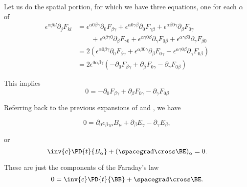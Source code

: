 Let us do the spatial portion, for which we have three equations, one for each \(\alpha\) of
%
\begin{equation}\label{eqn:relativisticElectrodynamicsL11b:1420}
\begin{aligned}
\epsilon^{\alpha j k l} \partial_j F_{k l}
&=
\epsilon^{\alpha 0 \beta \gamma} \partial_0 F_{\beta \gamma}
+\epsilon^{\alpha 0 \gamma \beta} \partial_0 F_{\gamma \beta}
+\epsilon^{\alpha \beta 0 \gamma} \partial_\beta F_{0 \gamma} \\
&\qquad +\epsilon^{\alpha \beta \gamma 0} \partial_\beta F_{\gamma 0}
+\epsilon^{\alpha \gamma 0 \beta} \partial_\gamma F_{0 \beta}
+\epsilon^{\alpha \gamma \beta 0} \partial_\gamma F_{\beta 0} \\
&=
2 \left(
\epsilon^{\alpha 0 \beta \gamma} \partial_0 F_{\beta \gamma}
+\epsilon^{\alpha \beta 0 \gamma} \partial_\beta F_{0 \gamma}
+\epsilon^{\alpha \gamma 0 \beta} \partial_\gamma F_{0 \beta}
\right) \\
&=
2 \epsilon^{0 \alpha \beta \gamma} \left(
-\partial_0 F_{\beta \gamma}
+\partial_\beta F_{0 \gamma}
- \partial_\gamma F_{0 \beta}
\right)
\end{aligned}
\end{equation}

This implies
%
\begin{equation}\label{eqn:relativisticElectrodynamicsL11:1320}
0 =
-\partial_0 F_{\beta \gamma}
+\partial_\beta F_{0 \gamma}
- \partial_\gamma F_{0 \beta}
\end{equation}

Referring back to the previous expansions of  and , we have

\begin{equation}\label{eqn:relativisticElectrodynamicsL11:1340}
0 =
\partial_0 \epsilon_{\beta\gamma\mu} B_\mu
+\partial_\beta E_\gamma
- \partial_\gamma E_{\beta},
\end{equation}

or
%
\begin{equation}\label{eqn:relativisticElectrodynamicsL11:1360}
\inv{c} \PD{t}{B_\alpha} + (\spacegrad \cross \BE)_\alpha = 0.
\end{equation}

These are just the components of the Faraday's law
%
\begin{equation}\label{eqn:relativisticElectrodynamicsL11:930}
0 = \inv{c} \PD{t}{\BB} + \spacegrad \cross \BE.
\end{equation}
%
